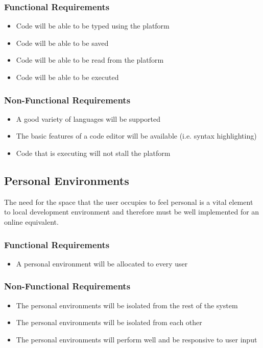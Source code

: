 \subsubsection{Functional Requirements}
\begin{itemize}
    \item Code will be able to be typed using the platform
    \item Code will be able to be saved
    \item Code will be able to be read from the platform
    \item Code will be able to be executed
\end{itemize}
\subsubsection{Non-Functional Requirements}
\begin{itemize}
    \item A good variety of languages will be supported
    \item The basic features of a code editor will be available (i.e. syntax highlighting)
    \item Code that is executing will not stall the platform
\end{itemize}

\subsection{Personal Environments}
The need for the space that the user occupies to feel personal is a vital element to local development environment and therefore must be well implemented for an online equivalent.

\subsubsection{Functional Requirements}
\begin{itemize}
    \item A personal environment will be allocated to every user
\end{itemize}
\subsubsection{Non-Functional Requirements}
\begin{itemize}
    \item The personal environments will be isolated from the rest of the system
    \item The personal environments will be isolated from each other
    \item The personal environments will perform well and be responsive to user input
\end{itemize}

